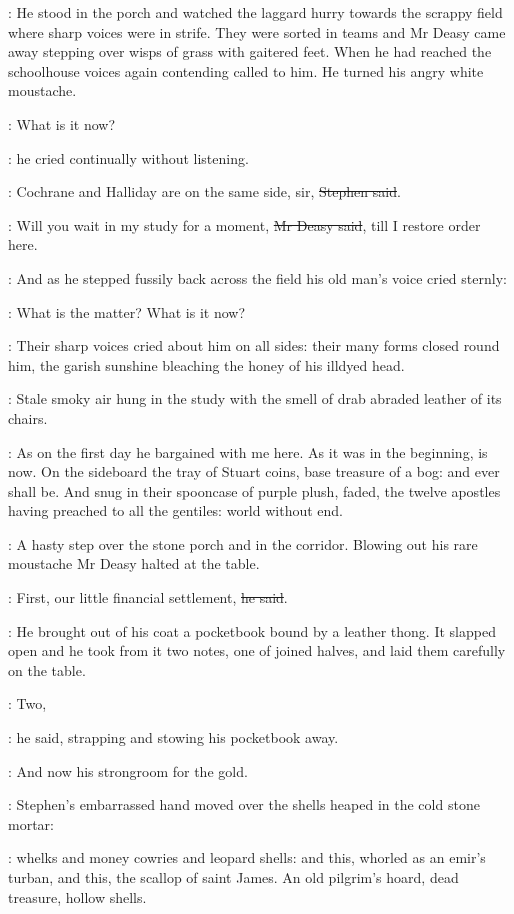 :
He stood in the porch and watched the laggard hurry towards the scrappy field
where sharp voices were in strife.
They were sorted in teams
and Mr Deasy came away stepping over wisps of grass with gaitered feet.
When he had reached the schoolhouse
voices again contending called to him.
He turned his angry white moustache.

\deasy:
What is it now?

:
he cried continually without listening.

\Stephen:
Cochrane and Halliday are on the same side, sir,
\sout{Stephen said}.

\deasy:
Will you wait in my study for a moment, \sout{Mr Deasy said},
till I restore order here.


:
And as he stepped fussily back across the field
his old man's voice cried sternly:

\deasy:
What is the matter?
What is it now?

:
Their sharp voices cried about him on all sides:
their many forms closed round him,
the garish sunshine bleaching the honey of his illdyed head.

:
Stale smoky air hung in the study
with the smell of drab abraded leather of its chairs.

\StephenInt:
As on the first day he bargained with me here.
As it was in the beginning, is now.
On the sideboard the tray of Stuart coins, base treasure of a bog:
and ever shall be.
And snug in their spooncase of purple plush, faded,
the twelve apostles having preached to all the gentiles:
world without end.

:
A hasty step over the stone porch and in the corridor.
Blowing out his rare moustache
Mr Deasy halted at the table.

\deasy:
First, our little financial settlement, \sout{he said}.

:
He brought out of his coat a pocketbook bound by a leather thong.
It slapped open and he took from it two notes, one of joined halves,
and laid them carefully on the table.

\deasy:
Two,

:
he said, strapping and stowing his pocketbook away.

\StephenInt:
And now his strongroom for the gold.

:
Stephen's embarrassed hand moved over the shells heaped in the cold stone mortar:

\StephenInt:
whelks and money cowries and leopard shells:
and this, whorled as an emir's turban,
and this, the scallop of saint James.
An old pilgrim's hoard, dead treasure, hollow shells.

